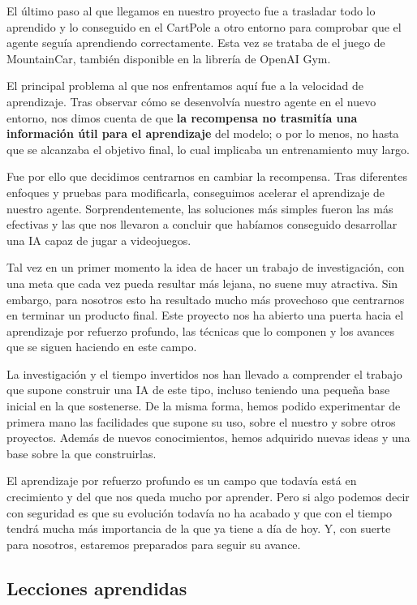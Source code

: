 El último paso al que llegamos en nuestro proyecto fue a trasladar todo lo aprendido y lo conseguido en el CartPole a otro entorno para comprobar que el agente seguía aprendiendo correctamente. Esta vez se trataba de el juego de MountainCar, también disponible en la librería de OpenAI Gym. 

El principal problema al que nos enfrentamos aquí fue a la velocidad de aprendizaje. Tras observar cómo se desenvolvía nuestro agente en el nuevo entorno, nos dimos cuenta de que \textbf{la recompensa no trasmitía una información útil para el aprendizaje} del modelo; o por lo menos, no hasta que se alcanzaba el objetivo final, lo cual implicaba un entrenamiento muy largo. 

Fue por ello que decidimos centrarnos en cambiar la recompensa. Tras diferentes enfoques y pruebas para modificarla, conseguimos acelerar el aprendizaje de nuestro agente. Sorprendentemente, las soluciones más simples fueron las más efectivas y las que nos llevaron a concluir que habíamos conseguido desarrollar una IA capaz de jugar a videojuegos.

Tal vez en un primer momento la idea de hacer un trabajo de investigación, con una meta que cada vez pueda resultar más lejana, no suene muy atractiva. Sin embargo, para nosotros esto ha resultado mucho más provechoso que centrarnos en terminar un producto final. Este proyecto nos ha abierto una puerta hacia el aprendizaje por refuerzo profundo, las técnicas que lo componen y los avances que se siguen haciendo en este campo. 

La investigación y el tiempo invertidos nos han llevado a comprender el trabajo que supone construir una IA de este tipo, incluso teniendo una pequeña base inicial en la que sostenerse. De la misma forma, hemos podido experimentar de primera mano las facilidades que supone su uso, sobre el nuestro y sobre otros proyectos. Además de nuevos conocimientos, hemos adquirido nuevas ideas y una base sobre la que construirlas. 

El aprendizaje por refuerzo profundo es un campo que todavía está en crecimiento y del que nos queda mucho por aprender. Pero si algo podemos decir con seguridad es que su evolución todavía no ha acabado y que con el tiempo tendrá mucha más importancia de la que ya tiene a día de hoy. Y, con suerte para nosotros, estaremos preparados para seguir su avance.

\subsection{Lecciones aprendidas}

